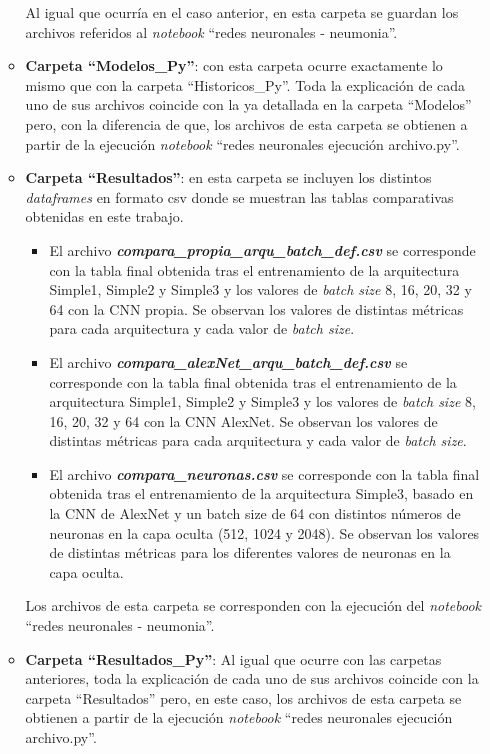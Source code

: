 \begin{itemize}
\begin{itemize}
        Al igual que ocurría en el caso anterior, en esta carpeta se guardan los archivos referidos al \textit{notebook} ``redes neuronales - neumonia''.
        \item \textbf{Carpeta ``Modelos\_Py''}: con esta carpeta ocurre exactamente lo mismo que con la carpeta ``Historicos\_Py''. Toda la explicación de cada uno de sus archivos coincide con la ya detallada en la carpeta ``Modelos'' pero, con la diferencia de que, los archivos de esta carpeta se obtienen a partir de la ejecución \textit{notebook} ``redes neuronales ejecución archivo.py''. 
    
        \item \textbf{Carpeta ``Resultados''}: en esta carpeta se incluyen los distintos \textit{dataframes} en formato csv donde se muestran las tablas comparativas obtenidas en este trabajo. 
        \begin{itemize}
            \item El archivo \textit{\textbf{compara\_propia\_arqu\_batch\_def.csv}} se corresponde con la tabla final obtenida tras el entrenamiento de la arquitectura Simple1, Simple2 y Simple3 y los valores de \textit{batch size} 8, 16, 20, 32 y 64 con la CNN propia. Se observan los valores de distintas métricas para cada arquitectura y cada valor de \textit{batch size}.
            \item El archivo \textit{\textbf{compara\_alexNet\_arqu\_batch\_def.csv}} se corresponde con la tabla final obtenida tras el entrenamiento de la arquitectura Simple1, Simple2 y Simple3 y los valores de \textit{batch size} 8, 16, 20, 32 y 64 con la CNN AlexNet. Se observan los valores de distintas métricas para cada arquitectura y cada valor de \textit{batch size}.
            \item El archivo \textit{\textbf{compara\_neuronas.csv}} se corresponde con la tabla final obtenida tras el entrenamiento de la arquitectura Simple3, basado en la CNN de AlexNet y un batch size de 64 con distintos números de neuronas en la capa oculta (512, 1024 y 2048). Se observan los valores de distintas métricas para los diferentes valores de neuronas en la capa oculta.
            
        \end{itemize}

        Los archivos de esta carpeta se corresponden con la ejecución del \textit{notebook} ``redes neuronales - neumonia''.

        \item \textbf{Carpeta ``Resultados\_Py''}: Al igual que ocurre con las  carpetas anteriores, toda la explicación de cada uno de sus archivos coincide con la carpeta ``Resultados'' pero, en este caso, los archivos de esta carpeta se obtienen a partir de la ejecución \textit{notebook} ``redes neuronales ejecución archivo.py''. 
        

\end{itemize}
\end{itemize}
